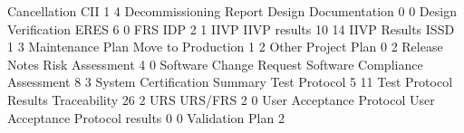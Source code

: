 \documentclass{article}
\begin{document}
\begin{Schunk}
\begin{Soutput}
                    Cancellation                              CII 
                               1                                4 
          Decommissioning Report             Design Documentation 
                               0                                0 
             Design Verification                             ERES 
                               6                                0 
                             FRS                              IDP 
                               2                                1 
                            IIVP                     IIVP results 
                              10                               14 
                    IIVP Results                             ISSD 
                               1                                3 
                Maintenance Plan               Move to Production 
                               1                                2 
                           Other                     Project Plan 
                               0                                2 
                   Release Notes                  Risk Assessment 
                               4                                0 
         Software Change Request   Software Compliance Assessment 
                               8                                3 
    System Certification Summary                    Test Protocol 
                               5                               11 
           Test Protocol Results                     Traceability 
                              26                                2 
                             URS                          URS/FRS 
                               2                                0 
        User Acceptance Protocol User Acceptance Protocol results 
                               0                                0 
                 Validation Plan 
                               2 
\end{Soutput}
\end{Schunk}
\end{document}

